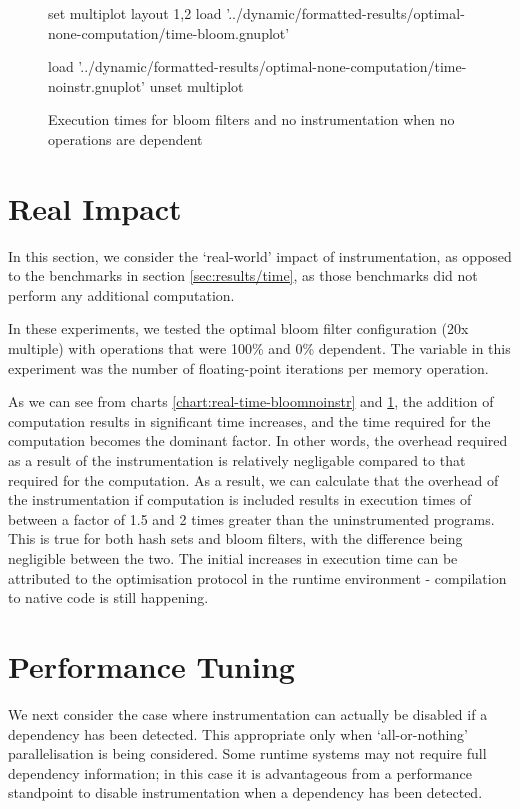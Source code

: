 \begin{figure}
	\centering
	\begin{gnuplot}[terminal=pdf]
	set multiplot layout 1,2
		load '../dynamic/formatted-results/optimal-none-computation/time-bloom.gnuplot'
		
		load '../dynamic/formatted-results/optimal-none-computation/time-noinstr.gnuplot'
	unset multiplot
	\end{gnuplot}
	\caption{Execution times for bloom filters and no instrumentation when no operations are dependent}
	\label{chart:real-time-hashnoinstty}
\end{figure}

\section{Real Impact} \label{sec:results/real}
In this section, we consider the `real-world' impact of instrumentation, as opposed to the benchmarks in section \ref{sec:results/time}, as those benchmarks did not perform any additional computation.

In these experiments, we tested the optimal bloom filter configuration (20x multiple) with operations that were 100\% and 0\% dependent. The variable in this experiment was the number of floating-point iterations per memory operation.

As we can see from charts \ref{chart:real-time-bloomnoinstr} and \ref{chart:real-time-hashnoinstty}, the addition of computation results in significant time increases, and the time required for the computation becomes the dominant factor. In other words, the overhead required as a result of the instrumentation is relatively negligable compared to that required for the computation. As a result, we can calculate that the overhead of the instrumentation if computation is included results in execution times of between a factor of 1.5 and 2 times greater than the uninstrumented programs. This is true for both hash sets and bloom filters, with the difference being negligible between the two. The initial increases in execution time can be attributed to the optimisation protocol in the runtime environment - compilation to native code is still happening.

\section{Performance Tuning} \label{sec:results/tuning}
We next consider the case where instrumentation can actually be disabled if a dependency has been detected. This appropriate only when `all-or-nothing' parallelisation is being considered. Some runtime systems may not require full dependency information; in this case it is advantageous from a performance standpoint to disable instrumentation when a dependency has been detected.

